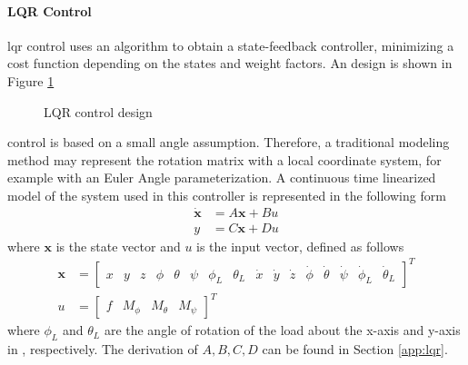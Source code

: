 \paragraph{LQR Control}
\acf{lqr} control uses an algorithm to obtain a state-feedback controller, minimizing a cost function depending on the states and weight factors. 
An  design is shown in Figure \ref{fig:set.lqr}
\begin{figure}[h!]
	\centering
	\caption{LQR control design\label{fig:set.lqr}}
\end{figure}

 control is based on a small angle assumption. Therefore, a traditional modeling method may represent the rotation matrix with a local coordinate system, for example with an Euler Angle parameterization. 
A continuous time linearized model of the system used in this controller is represented in the following form 
\begin{align}\label{eq:ss}
\mathbf{\dot{x} }&=A\mathbf{x}+Bu\\
y&=C\mathbf{x}+Du
\end{align}
where $ \mathbf{x} $ is the state vector and $ u $ is the input vector, defined as follows
\begin{align}\label{eq:state}
\mathbf{x}&=\begin{bmatrix}
x&y&z&\phi&\theta&\psi&\phi_L&\theta_L&\dot{x}&\dot{y}&\dot{z}&\dot{\phi}&\dot{\theta}&\dot{\psi}&\dot{\phi}_L&\dot{\theta}_L
\end{bmatrix}^T\\
	u&=\begin{bmatrix}
		f&M_\phi&M_\theta&M_\psi
	\end{bmatrix}^T
\end{align}
where $ \phi_L $ and $ \theta_L $ are the angle of rotation of the load about the x-axis and y-axis in \BF, respectively.
The derivation of $ A, B, C, D $ can be found in Section \ref{app:lqr}. 

